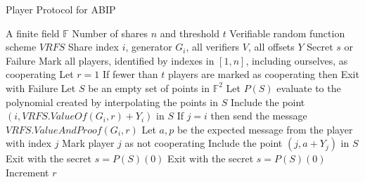 \documentclass{dalcsthesis}
\begin{document}
\begin{algorithm}
  \caption{Player Protocol for ABIP}
  \label{alg:ABIP:Player}
  \begin{algorithmic}
    \INPUT A finite field $\mathbb{F}$
    \INPUT Number of shares $n$ and threshold $t$
    \INPUT Verifiable random function scheme $VRFS$
    \INPUT Share index $i$, generator $G_i$, all verifiers $V$, all offsets $Y$
    \OUTPUT Secret $s$ or Failure
    \STATE Mark all players, identified by indexes in $[1, n]$, including ourselves, as cooperating
    \STATE Let $r = 1$
      \STATE If fewer than $t$ players are marked as cooperating then Exit with Failure
      \STATE Let $S$ be an empty set of points in $\mathbb{F}^2$
      \STATE Let $P(S)$ evaluate to the polynomial created by interpolating the points in $S$
      \STATE Include the point $(i, VRFS.ValueOf(G_i, r) + Y_i)$ in $S$
        \STATE If $j = i$ then send the message $VRFS.ValueAndProof(G_i, r)$
        \STATE Let $a, p$ be the expected message from the player with index $j$
          \STATE Mark player $j$ as not cooperating
        \ELSE
          \STATE Include the point $(j, a + Y_j)$ in $S$
            \STATE Exit with the secret $s = P(S)(0)$
          \ENDIF
        \ENDIF
      \ENDFOR
        \STATE Exit with the secret $s = P(S)(0)$
      \ENDIF
      \STATE Increment $r$
    \ENDWHILE
  \end{algorithmic}
\end{algorithm}
\end{document}
